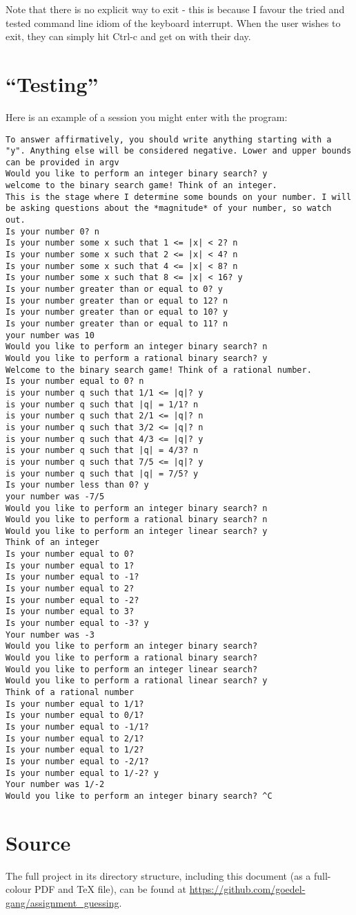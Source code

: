 \documentclass[fleqn,a4paper,11pt]{article}
\begin{document}
    Note that there is no explicit way to exit - this is because I favour the
    tried and tested command line idiom of the keyboard interrupt. When the user
    wishes to exit, they can simply hit Ctrl-c and get on with their day.

    \section{``Testing''}

    Here is an example of a session you might enter with the program:

\begin{lstlisting}[caption=Typical session]
To answer affirmatively, you should write anything starting with a "y". Anything else will be considered negative. Lower and upper bounds can be provided in argv
Would you like to perform an integer binary search? y
welcome to the binary search game! Think of an integer.
This is the stage where I determine some bounds on your number. I will be asking questions about the *magnitude* of your number, so watch out.
Is your number 0? n
Is your number some x such that 1 <= |x| < 2? n
Is your number some x such that 2 <= |x| < 4? n
Is your number some x such that 4 <= |x| < 8? n
Is your number some x such that 8 <= |x| < 16? y
Is your number greater than or equal to 0? y
Is your number greater than or equal to 12? n
Is your number greater than or equal to 10? y
Is your number greater than or equal to 11? n
your number was 10
Would you like to perform an integer binary search? n
Would you like to perform a rational binary search? y
Welcome to the binary search game! Think of a rational number.
Is your number equal to 0? n
is your number q such that 1/1 <= |q|? y
is your number q such that |q| = 1/1? n
is your number q such that 2/1 <= |q|? n
is your number q such that 3/2 <= |q|? n
is your number q such that 4/3 <= |q|? y
is your number q such that |q| = 4/3? n
is your number q such that 7/5 <= |q|? y
is your number q such that |q| = 7/5? y
Is your number less than 0? y
your number was -7/5
Would you like to perform an integer binary search? n
Would you like to perform a rational binary search? n
Would you like to perform an integer linear search? y
Think of an integer
Is your number equal to 0?
Is your number equal to 1?
Is your number equal to -1?
Is your number equal to 2?
Is your number equal to -2?
Is your number equal to 3?
Is your number equal to -3? y
Your number was -3
Would you like to perform an integer binary search?
Would you like to perform a rational binary search?
Would you like to perform an integer linear search?
Would you like to perform a rational linear search? y
Think of a rational number
Is your number equal to 1/1?
Is your number equal to 0/1?
Is your number equal to -1/1?
Is your number equal to 2/1?
Is your number equal to 1/2?
Is your number equal to -2/1?
Is your number equal to 1/-2? y
Your number was 1/-2
Would you like to perform an integer binary search? ^C
\end{lstlisting}

    \section{Source}
    The full project in its directory structure, including this document (as a
    full-colour PDF and \TeX{} file), can be found at
    \url{https://github.com/goedel-gang/assignment_guessing}.
\end{document}
